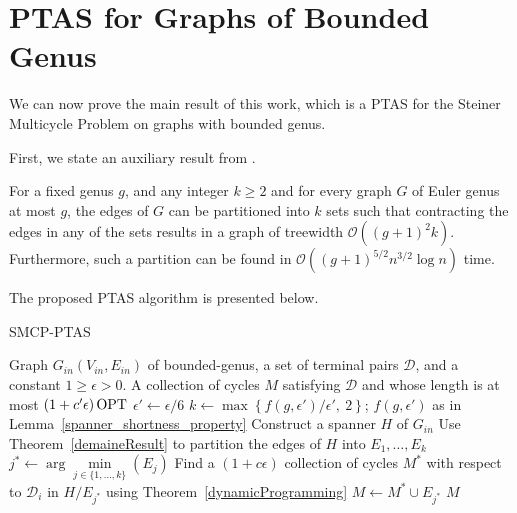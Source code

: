 \section{PTAS for Graphs of Bounded Genus}
\label{section:ptas_bounded_genus}

We can now prove the main result of this work, which is a PTAS for the Steiner Multicycle Problem on graphs with bounded genus.

First, we state an auxiliary result from \cite{Demaine2010}.

\begin{theorem} \label{demaineResult}
    For a fixed genus \(g\), and any integer \(k \geq 2\) and for every graph \(G\) of Euler genus at most \(g\), the edges of \(G\) can be partitioned into \(k\) sets such that contracting the edges in any of the sets results in a graph of treewidth \(\mathcal{O}((g + 1)^2k)\). Furthermore, such a partition can be found in \(\mathcal{O}((g+ 1)^{5/2} n^{3/2} \log{n})\) time.
\end{theorem}

The proposed PTAS algorithm is presented below.

\begin{algorithm}
\caption{SMCP-PTAS}
\label{smcp-ptas}
\begin{algorithmic}[1]

\Require Graph \(G_{in}(V_{in} , E_{in})\) of bounded-genus, a set of terminal pairs \(\mathcal{D}\), and a constant \(1 \geq \epsilon > 0\).
\Ensure A collection of cycles \(M\) satisfying \(\mathcal{D}\) and whose length is at most \((1 + c' \epsilon) \operatorname{\textrm{OPT}}\)
\State  \(\epsilon' \gets \epsilon / 6\)
\State  \(k \gets \max\left \{ f(g, \epsilon')/{\epsilon'}, \: 2\right \}\); \(f(g, \epsilon')\) as in Lemma~\ref{spanner_shortness_property} \label{alg_smcp_ptas:k}
\State Construct a spanner \(H\) of \(G_{in}\) \label{alg_smcp_ptas:SpannerCall}
\State Use Theorem~\ref{demaineResult} to partition the edges of \(H\) into \(E_1, \dots, E_k\) \label{alg_smcp_ptas:partDemaine}
\State  \(j^\ast \gets \arg\min\limits_{j \in \{1,\ldots,k\}}(E_j)\)
\State Find a \((1 + c \epsilon)\) collection of cycles \(M^\ast\) with respect to \(\mathcal{D}_i\) in \(H/E_{j^\ast}\) using Theorem~\ref{dynamicProgramming} \label{alg_smcp_ptas:dp}
\State \(M \gets M^\ast \cup E_{j^\ast}\)
\State \Return  \(M\)

\end{algorithmic}
\end{algorithm}

